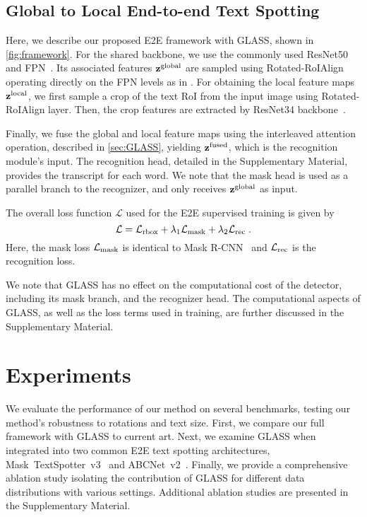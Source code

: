 \documentclass[runningheads]{llncs}
\begin{document}
\subsection{Global to Local End-to-end Text Spotting}
\label{sec:e2e}
Here, we describe our proposed E2E framework 
with GLASS, shown in \cref{fig:framework}.
For the shared backbone, we use the commonly used ResNet50 and FPN~\cite{lin2017feature}.
Its associated features $\mathbf{z}^{\rm global}$ are sampled using Rotated-RoIAlign
operating directly on the FPN levels as in \cite{qin2019towards}.
For obtaining the local feature maps $\mathbf{z}^{\rm local}$, we first sample a crop of the text RoI from the input image using Rotated-RoIAlign layer.
Then, the crop features are extracted by  ResNet34 backbone~\cite{focusing_att2017}.

Finally, we fuse the global and local feature maps using the interleaved attention operation, described in \cref{sec:GLASS}, yielding $\mathbf{z}^{\rm fused}$, which is the recognition module's input.
The recognition head, detailed in the Supplementary Material, provides the transcript for each word.
We note that the mask head is used as a parallel branch to the recognizer, and only receives $\mathbf{z}^{\rm global}$ as input.

The overall loss function $\mathcal{L}$ used for the E2E supervised training is given by
\begin{equation}
    \mathcal{L} =  \mathcal{L}_{\rm rbox} +  \lambda_1  \mathcal{L}_{\rm mask} + \lambda_2  \mathcal{L}_{\rm rec}
    \;.
   \label{eq:total_loss}
\end{equation}
Here, the mask loss $\mathcal{L}_{\rm mask}$ is identical to Mask R-CNN~\cite{he2017mask} and $\mathcal{L}_{\rm rec}$ is the recognition loss.

We note that GLASS has no effect on the computational cost of the detector, including its mask branch, and the recognizer head.
The computational aspects of GLASS, as well as the loss terms used in training, are further discussed in the Supplementary Material.

%
 
\section{Experiments}
\label{sec:experiments}

We evaluate the performance of our method on several benchmarks, testing our method's robustness to rotations and text size.
First, we compare our full framework with GLASS to current art.
Next, we examine GLASS when integrated into two common E2E text spotting architectures, Mask~TextSpotter~v3~\cite{liao2020spotterV3} and ABCNet~v2~\cite{liu2021abcnetV2}.
Finally, we provide a comprehensive ablation study isolating the contribution of GLASS for different data distributions with various settings.
Additional ablation studies are presented in the Supplementary Material.
\end{document}
